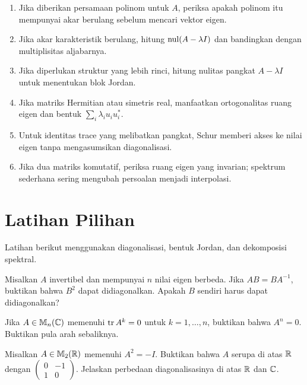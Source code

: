 \begin{enumerate}[label=\arabic*.,leftmargin=*,itemsep=3pt]
    \item Jika diberikan persamaan polinom untuk $A$, periksa apakah
        polinom itu mempunyai akar berulang sebelum mencari vektor eigen.
    \item Jika akar karakteristik berulang, hitung
        $\operatorname{nul}(A-\lambda I)$ dan bandingkan dengan multiplisitas aljabarnya.
    \item Jika diperlukan struktur yang lebih rinci, hitung nulitas
        pangkat $A-\lambda I$ untuk menentukan blok Jordan.
    \item Jika matriks Hermitian atau simetris real, manfaatkan
        ortogonalitas ruang eigen dan bentuk $\sum_i\lambda_i u_iu_i^*$.
    \item Untuk identitas trace yang melibatkan pangkat, Schur memberi
        akses ke nilai eigen tanpa mengasumsikan diagonalisasi.
    \item Jika dua matriks komutatif, periksa ruang eigen yang invarian;
        spektrum sederhana sering mengubah persoalan menjadi interpolasi.
\end{enumerate}

\section{Latihan Pilihan}
\label{dekomp:latihan}

Latihan berikut menggunakan diagonalisasi, bentuk Jordan, dan dekomposisi spektral.

\begin{latihan}\label{eigen:lat-komutatif}
    Misalkan $A$ invertibel dan mempunyai $n$ nilai eigen berbeda.
    Jika $AB=BA^{-1}$, buktikan bahwa $B^2$ dapat didiagonalkan.
    Apakah $B$ sendiri harus dapat didiagonalkan?
\end{latihan}

\begin{latihan}\label{eigen:lat-trace}
    Jika $A\in\mathbb{M}_n(\mathbb{C})$ memenuhi $\operatorname{tr} A^k=0$ untuk
    $k=1,\ldots,n$, buktikan bahwa $A^n=0$.
    Buktikan pula arah sebaliknya.
\end{latihan}

\begin{latihan}\label{eigen:lat-real}
    Misalkan $A\in\mathbb{M}_2(\mathbb{R})$ memenuhi $A^2=-I$.
    Buktikan bahwa $A$ serupa di atas $\mathbb{R}$ dengan
    $\begin{pmatrix}0&-1\\1&0\end{pmatrix}$.
    Jelaskan perbedaan diagonalisasinya di atas $\mathbb{R}$ dan $\mathbb{C}$.
\end{latihan}

